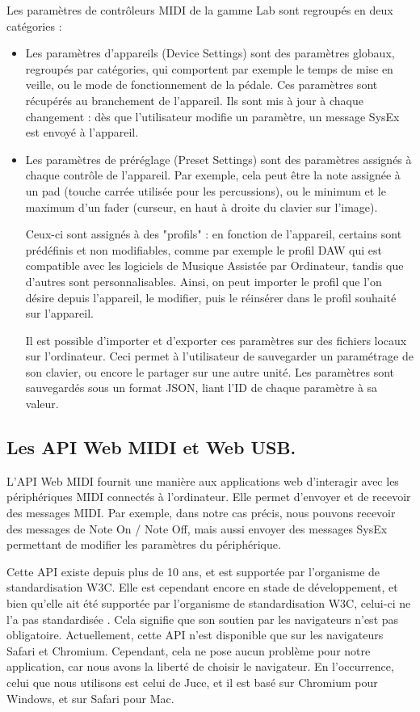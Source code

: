 \documentclass[francais]{rapportPFE}  %
\begin{document}
Les paramètres de contrôleurs MIDI de la gamme Lab sont regroupés en deux catégories :
\begin{itemize}
    \item Les paramètres d'appareils (Device Settings) sont des paramètres globaux, regroupés par catégories, qui comportent par exemple le temps de mise en veille, ou le mode de fonctionnement de la pédale. Ces paramètres sont récupérés au branchement de l'appareil. Ils sont mis à jour à chaque changement : dès que l'utilisateur modifie un paramètre, un message SysEx est envoyé à l'appareil.
    \item Les paramètres de préréglage (Preset Settings) sont des paramètres assignés à chaque contrôle de l'appareil. Par exemple, cela peut être la note assignée à un pad (touche carrée utilisée pour les percussions), ou le minimum et le maximum d'un fader (curseur, en haut à droite du clavier sur l'image). 
    
    Ceux-ci sont assignés à des "profils" : en fonction de l'appareil, certains sont prédéfinis et non modifiables, comme par exemple le profil DAW qui est compatible avec les logiciels de Musique Assistée par Ordinateur, tandis que d'autres sont personnalisables. Ainsi, on peut importer le profil que l'on désire depuis l'appareil, le modifier, puis le réinsérer dans le profil souhaité sur l'appareil. 

    Il est possible d'importer et d'exporter ces paramètres sur des fichiers locaux sur l'ordinateur. Ceci permet à l'utilisateur de sauvegarder un paramétrage de son clavier, ou encore le partager sur une autre unité. Les paramètres sont sauvegardés sous un format JSON, liant l'ID de chaque paramètre à sa valeur.
\end{itemize}

\subsection{Les API Web MIDI et Web USB.}

L'API Web MIDI \cite{webmidi1}
fournit une manière aux applications web d'interagir avec les périphériques MIDI connectés à l'ordinateur. Elle permet d'envoyer et de recevoir des messages MIDI. Par exemple, dans notre cas précis, nous pouvons recevoir des messages de Note On / Note Off, mais aussi envoyer des messages SysEx permettant de modifier les paramètres du périphérique.

Cette API existe depuis plus de 10 ans, et est supportée par l'organisme de standardisation W3C. Elle est cependant encore en stade de développement, et bien qu'elle ait été supportée par l'organisme de standardisation W3C, celui-ci ne l'a pas standardisée \cite{webmidi2}. Cela signifie que son soutien par les navigateurs n'est pas obligatoire. Actuellement, cette API n'est disponible que sur les navigateurs Safari et Chromium. Cependant, cela ne pose aucun problème pour notre application, car nous avons la liberté de choisir le navigateur. En l'occurrence, celui que nous utilisons est celui de Juce, et il est basé sur Chromium pour Windows, et sur Safari pour Mac.
\end{document}
